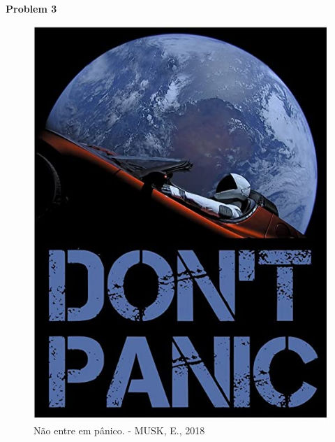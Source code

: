 \documentclass[12pt]{abntex2}
\begin{document}
\vspace{6cm}

\textbf{Problem 3}
\vspace{1cm}
	\begin{figure}[h]
	\center
	\caption{\label{im:1} Não entre em pânico. - MUSK, E., 2018}
		\includegraphics[width=0.85\linewidth, height=0.65\paperheight]{dont.jpg}
	\end{figure}
\end{document}
